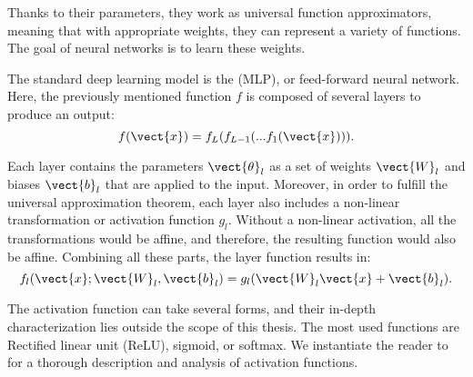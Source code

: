 Thanks to their parameters, they work as universal function approximators, meaning that with appropriate weights, they can represent a variety of functions. The goal of neural networks is to learn these weights.

The standard deep learning model is the  (MLP), or feed-forward neural network. Here, the previously mentioned function $f$ is composed of several layers to produce an output:
\begin{equation*}
    f(\vect{x}) = f_L(f_{L-1}(...f_1(\vect{x}))).
\end{equation*}

Each layer contains the parameters $\vect{\theta}_l$ as a set of weights $\vect{W}_l$ and biases $\vect{b}_l$ that are applied to the input. Moreover, in order to fulfill the universal approximation theorem, each layer also includes a non-linear transformation or activation function $g_l$. Without a non-linear activation, all the transformations would be affine, and therefore, the resulting function would also be affine. Combining all these parts, the layer function results in:
\begin{equation*}
    f_l(\vect{x};\vect{W}_l,\vect{b}_l) = {g_l}(\vect{W}_l\vect{x} + \vect{b}_l).
\end{equation*}

The activation function can take several forms, and their in-depth characterization lies outside the scope of this thesis. The most used functions are Rectified linear unit (ReLU), sigmoid, or softmax. We instantiate the reader to  for a thorough description and analysis of activation functions.


